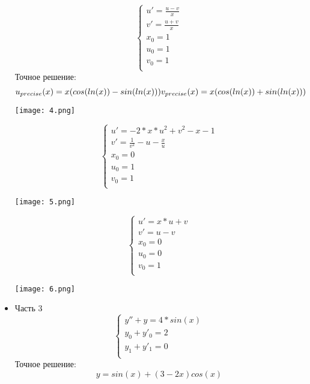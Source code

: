 \documentclass[a4paper,12pt,titlepage,finall]{article}
\begin{document}
\begin{itemize}
\begin{equation*}
 \begin{cases}
   u' = \frac{u - v}{x}\\
   v' = \frac{u + v}{x}\\
   x_0 = 1\\
   u_0 = 1\\
   v_0 = 1\\
 \end{cases}
\end{equation*}
Точное решение: $$u_{precise}(x) = x(cos(ln(x))-sin(ln(x)))\\
	v_{precise}(x) = x(cos(ln(x))+sin(ln(x))) $$ \newline


\texttt{[image: 4.png]}\newline
\newpage

\begin{equation*}
 \begin{cases}
   u' =-2*x*u^{2}+v^{2}-x-1\\
   v' = \frac{1}{v^{2}}-u-\frac{x}{u}\\
   x_0 = 0\\
   u_0 = 1\\
   v_0 = 1\\
 \end{cases}
\end{equation*}

\texttt{[image: 5.png]}\newline

\begin{equation*}
 \begin{cases}
   u' = x*u+v\\
   v' = u-v\\
   x_0 = 0\\
   u_0 = 0\\
   v_0 = 1\\
 \end{cases}
\end{equation*}

\texttt{[image: 6.png]}\newline

\newpage

\item Часть 3\\

\begin{equation*}
 \begin{cases}
  y''+y=4*sin(x)\\
  y_{0}+y'_{0}=2\\
  y_{1}+y'_{1}=0\\
 \end{cases}
\end{equation*}
Точное решение: $$y =sin(x)+(3-2x)cos(x)$$ \newline



\end{itemize}
\end{document}
